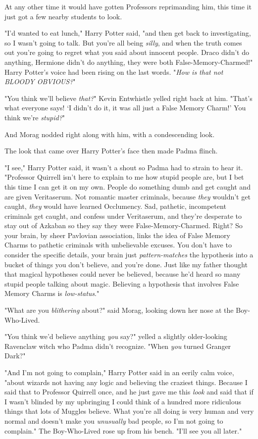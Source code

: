 At any other time it would have gotten Professors reprimanding him, this time
it just got a few nearby students to look.

"I'd wanted to eat lunch," Harry Potter said, "and then get back to
investigating, so I wasn't going to talk. But you're all being \emph{silly},
and when the truth comes out you're going to regret what you said about
innocent people. Draco didn't do anything, Hermione didn't do anything, they
were both False-Memory-Charmed!" Harry Potter's voice had been rising on the
last words. "\emph{How is that not BLOODY OBVIOUS?}"

"You think we'll believe \emph{that?}" Kevin Entwhistle yelled right back at
him. "That's what everyone says! `I didn't do it, it was all just a False
Memory Charm!' You think we're \emph{stupid?}"

And Morag nodded right along with him, with a condescending look.

The look that came over Harry Potter's face then made Padma flinch.

"I see," Harry Potter said, it wasn't a shout so Padma had to strain to hear
it. "Professor Quirrell isn't here to explain to me how stupid people are, but
I bet this time I can get it on my own. People do something dumb and get caught
and are given Veritaserum. Not romantic master criminals, because \emph{they}
wouldn't get caught, \emph{they} would have learned Occlumency. Sad, pathetic,
incompetent criminals get caught, and confess under Veritaserum, and they're
desperate to stay out of Azkaban so they say they were False-Memory-Charmed.
Right? So your brain, by sheer Pavlovian association, links the idea of False
Memory Charms to pathetic criminals with unbelievable excuses. You don't have
to consider the specific details, your brain just \emph{pattern-matches} the
hypothesis into a bucket of things you don't believe, and you're done. Just
like my father thought that magical hypotheses could never be believed, because
he'd heard so many stupid people talking about magic. Believing a hypothesis
that involves False Memory Charms is \emph{low-status}."

"What are you \emph{blithering} about?" said Morag, looking down her nose at
the Boy-Who-Lived.

"You think we'd believe anything \emph{you} say?" yelled a slightly
older-looking Ravenclaw witch who Padma didn't recognize. "When \emph{you}
turned Granger Dark?"

"And I'm not going to complain," Harry Potter said in an eerily calm voice,
"about wizards not having any logic and believing the craziest things. Because
I said that to Professor Quirrell once, and he just gave me this \emph{look}
and said that if I wasn't blinded by my upbringing I could think of a hundred
more ridiculous things that lots of Muggles believe. What you're all doing is
very human and very normal and doesn't make you \emph{unusually} bad people, so
I'm not going to complain." The Boy-Who-Lived rose up from his bench. "I'll see
you all later."

